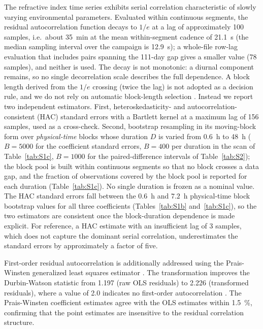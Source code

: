 \documentclass[aps,prapplied,reprint,superscriptaddress]{revtex4-2}
\begin{document}
The refractive index time series exhibits serial correlation characteristic of slowly varying environmental parameters. Evaluated within continuous segments, the residual autocorrelation function decays to $1/e$ at a lag of approximately 100 samples, i.e.\ about \SI{35}{\minute} at the mean within-segment cadence of \SI{21.1}{\second} (the median sampling interval over the campaign is \SI{12.9}{\second}); a whole-file row-lag evaluation that includes pairs spanning the \num{111}-day gap gives a smaller value (78 samples), and neither is used. The decay is not monotonic: a diurnal component remains, so no single decorrelation scale describes the full dependence. A block length derived from the $1/e$ crossing (twice the lag) is not adopted as a decision rule, and we do not rely on automatic block-length selection \cite{politis2004automatic}. Instead we report two independent estimators. First, heteroskedasticity- and autocorrelation-consistent (HAC) standard errors with a Bartlett kernel \cite{newey1987hypothesis,andrews1991heteroskedasticity} at a maximum lag of 156 samples, used as a cross-check. Second, bootstrap resampling \cite{efron1979bootstrap} in its moving-block form \cite{kunsch1989jackknife,politis1994stationary} over \emph{physical-time} blocks whose duration $D$ is varied from \SI{0.6}{\hour} to \SI{48}{\hour} ($B = 5000$ for the coefficient standard errors, $B = 400$ per duration in the scan of Table~\ref{tab:S1c}, $B = 1000$ for the paired-difference intervals of Table~\ref{tab:S2}); the block pool is built within continuous segments so that no block crosses a data gap, and the fraction of observations covered by the block pool is reported for each duration (Table~\ref{tab:S1c}). No single duration is frozen as a nominal value. The HAC standard errors fall between the $0.6$~h and $7.2$~h physical-time block bootstrap values for all three coefficients (Tables~\ref{tab:S1b} and~\ref{tab:S1c}), so the two estimators are consistent once the block-duration dependence is made explicit. For reference, a HAC estimate with an insufficient lag of 3 samples, which does not capture the dominant serial correlation, underestimates the standard errors by approximately a factor of five.

First-order residual autocorrelation is additionally addressed using the Prais-Winsten generalized least squares estimator \cite{prais1954trend}. The transformation improves the Durbin-Watson statistic from 1.197 (raw OLS residuals) to 2.226 (transformed residuals), where a value of 2.0 indicates no first-order autocorrelation \cite{durbin1950testing}. The Prais-Winsten coefficient estimates agree with the OLS estimates within \SI{1.5}{\percent}, confirming that the point estimates are insensitive to the residual correlation structure.
\end{document}
